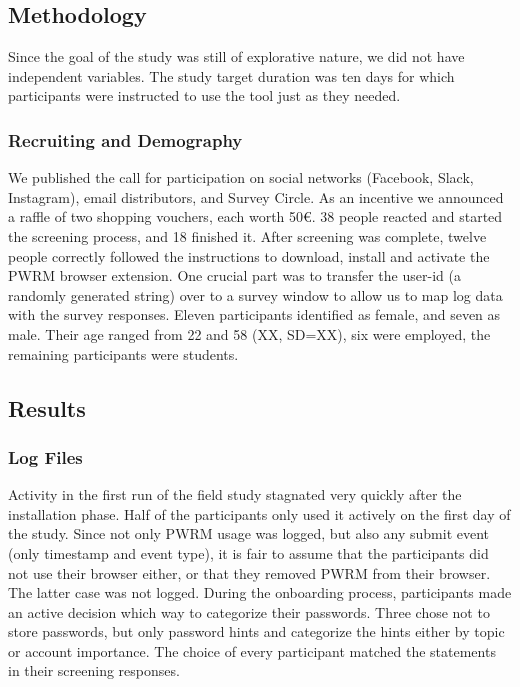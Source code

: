 \subsection{Methodology}
Since the goal of the study was still of explorative nature, we did not have independent variables. The study target duration was ten days for which participants were instructed to use the tool just as they needed. 

\subsubsection{Recruiting and Demography}
We published the call for participation on social networks (Facebook, Slack, Instagram), email distributors, and Survey Circle. As an incentive we announced a raffle of two shopping vouchers, each worth 50€. 38 people reacted and started the screening process, and 18 finished it. After screening was complete, twelve people correctly followed the instructions to download, install and activate the PWRM browser extension. One crucial part was to transfer the user-id (a randomly generated string) over to a survey window to allow us to map log data with the survey responses. Eleven participants identified as female, and seven as male. Their age ranged from 22 and 58 (\average XX, SD=XX), six were employed, the remaining participants were students. 

\subsection{Results}
\subsubsection{Log Files}
Activity in the first run of the field study stagnated very quickly after the installation phase. Half of the participants only used it actively on the first day of the study. Since not only PWRM usage was logged, but also any submit event (only timestamp and event type), it is fair to assume that the participants did not use their browser either, or that they removed PWRM from their browser. The latter case was not logged. During the onboarding process, participants made an active decision which way to categorize their passwords. Three chose not to store passwords, but only password hints and categorize the hints either by topic or account importance. The choice of every participant matched the statements in their screening responses. 

